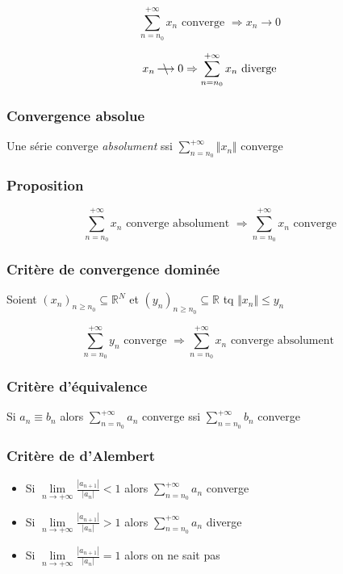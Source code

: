 \documentclass[a4paper,10pt]{article}
\newcommand{\ap}{\rightarrow}
\newcommand{\nap}{ \longrightarrow {\kern-13,5pt{\backslash}}~~}
\newcommand{\R}{\mathbb{R}}
\newcommand{\so}{\Rightarrow}
\newcommand{\nconv}[1]{\mathop{\nap}\limits_{#1}}
\newcommand{\abs}[1]{\left\vert #1 \right\vert}
\newcommand{\clim}[1]{\lim\limits_{#1}}
\newcommand{\series}{\sum_{n=n_0}^{+\infty}}
\begin{document}
$$\sum_{n=n_0}^{+\infty} x_n \mbox{ converge } \so x_n \ap 0$$

$$x_n \nconv{~} 0 \so \sum_{n=n_0}^{+\infty} x_n \mbox{ diverge}$$

\subsubsection{Convergence absolue}

Une série converge \textit{absolument} ssi $\series \Vert x_n \Vert$ converge

\subsubsection{Proposition}

$$\series x_n \mbox{ converge absolument } \so \series x_n \mbox{ converge}$$

\subsubsection{Critère de convergence dominée}

Soient $\left( x_n \right)_{n\geq n_0} \subseteq \R^N$ et $\left( y_n \right)_{n \geq n_0} \subseteq \R$ tq $\Vert x_n \Vert \leq y_n$

$$\series y_n \mbox{ converge } \so \series x_n \mbox{ converge absolument }$$

\subsubsection{Critère d'équivalence}

Si $a_n \equiv b_n$ alors $\displaystyle \series a_n$ converge ssi $\displaystyle \series b_n$ converge

\subsubsection{Critère de d'Alembert}

\begin{itemize}
	\item{Si $\displaystyle \clim{n \ap +\infty} \frac{\abs{a_{n+1}}}{\abs{a_n}} < 1$ alors $\displaystyle \series a_n$ converge}
	\item{Si $\displaystyle \clim{n \ap +\infty} \frac{\abs{a_{n+1}}}{\abs{a_n}} > 1$ alors $\displaystyle \series a_n$ diverge}
	\item{Si $\displaystyle \clim{n \ap +\infty} \frac{\abs{a_{n+1}}}{\abs{a_n}} = 1$ alors on ne sait pas}
\end{itemize}
\end{document}
